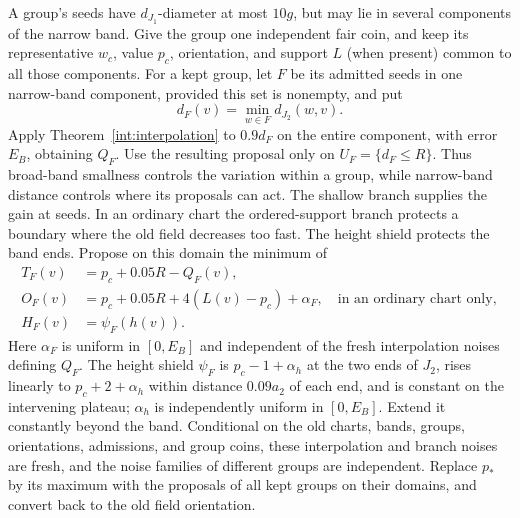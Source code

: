 A group's seeds have $d_{J_1}$-diameter at most $10g$, but may lie in
several components of the narrow band. Give the group one independent
fair coin, and keep its representative $w_c$, value $p_c$, orientation,
and support $L$ (when present) common to all those components. For a kept
group, let $F$ be its admitted seeds in one narrow-band component,
provided this set is nonempty, and put
\[
 d_F(v)=\min_{w\in F}d_{J_2}(w,v).
\]
Apply Theorem~\ref{int:interpolation} to $0.9d_F$ on the entire
component, with error $E_B$, obtaining $Q_F$. Use the resulting proposal
only on $U_F=\{d_F\le R\}$. Thus broad-band smallness controls the
variation within a group, while narrow-band distance controls where
its proposals can act. The shallow branch supplies the gain at seeds.
In an ordinary chart the ordered-support branch protects a boundary where
the old field decreases too fast. The height shield protects the band ends.
Propose on this domain the minimum of
\begin{align}
 T_F(v)&=p_c+0.05R-Q_F(v),\label{sec:shallow}\\
 O_F(v)&=p_c+0.05R+4(L(v)-p_c)+\alpha_F,
             \quad\text{in an ordinary chart only},\label{sec:ordered-branch}\\
 H_F(v)&=\psi_F(h(v)).\label{sec:height-branch}
\end{align}
Here $\alpha_F$ is uniform in $[0,E_B]$ and independent of the fresh
interpolation noises defining $Q_F$. The height shield $\psi_F$
is $p_c-1+\alpha_h$ at the two ends of $J_2$, rises linearly to
$p_c+2+\alpha_h$ within distance $0.09a_2$ of each end, and is constant
on the intervening plateau; $\alpha_h$ is independently uniform in
$[0,E_B]$. Extend it constantly beyond the band. Conditional on the old
charts, bands, groups, orientations, admissions, and group coins, these
interpolation and branch noises are fresh, and the noise families of
different groups are independent. Replace $p_*$ by its maximum with
the proposals of all kept groups on their domains, and convert back to
the old field orientation.

